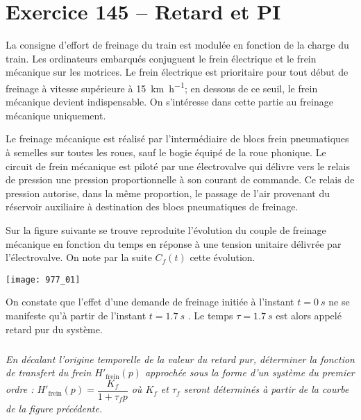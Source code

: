 \section*{Exercice 145 -- Retard et PI}
\setcounter{exo}{0}


La consigne d’effort de freinage du train est modulée en fonction de la charge du train. Les ordinateurs
embarqués conjuguent le frein électrique et le frein mécanique sur les motrices. Le frein électrique est
prioritaire pour tout début de freinage à vitesse supérieure à \SI{15}{km.h^{-1}}; en dessous de ce seuil, le frein
mécanique devient indispensable. On s’intéresse dans cette partie au freinage mécanique uniquement.

Le freinage mécanique est réalisé par l’intermédiaire de blocs frein pneumatiques à semelles sur toutes les
roues, sauf le bogie équipé de la roue phonique. Le circuit de frein mécanique est piloté par une électrovalve
qui délivre vers le relais de pression une pression proportionnelle à son courant de commande. Ce relais de
pression autorise, dans la même proportion, le passage de l’air provenant du réservoir auxiliaire à
destination des blocs pneumatiques de freinage.

Sur la figure suivante se trouve reproduite l’évolution du couple de freinage mécanique en fonction du temps en
réponse à une tension unitaire délivrée par l’électrovalve. On note par la suite $C_f (t)$ cette évolution.


\begin{center}
\texttt{[image: 977\_01]}%
\end{center}

On constate que l’effet d’une demande de freinage initiée à l’instant $t = \SI{0}{s}$ ne se manifeste qu’à partir de
l’instant $t =\SI{1,7}{s}$ . Le temps $\tau = \SI{1,7}{s}$ est alors appelé retard pur du système.

\subparagraph{}
\textit{En décalant l’origine temporelle de la valeur du retard pur, déterminer la fonction de transfert
du frein $H'_{\text{frein}} ( p)$ approchée sous la forme d’un système du premier ordre : $H'_{\text{frein}} ( p) = \dfrac{K_f}{1+\tau_f p}$ où $K_f$ et $\tau_f$ seront déterminés à partir de la courbe de la figure précédente.}
\ifprof
\begin{corrige}
\end{corrige}
\else
\fi

